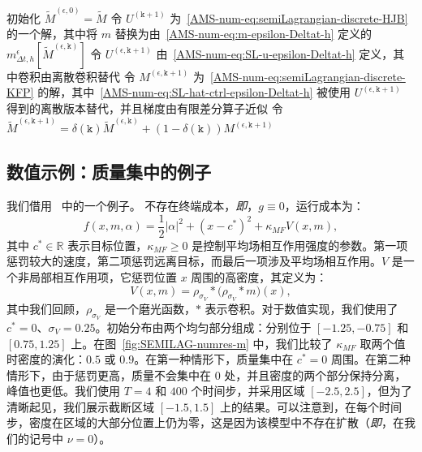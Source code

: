\documentclass{amsproc}
\theoremstyle{definition}
\theoremstyle{remark}
\numberwithin{equation}{section}
\newcommand{\RR}{{\mathbb R}}
\newcommand{\ctrl}{\alpha}
\begin{document}
\begin{algorithm}[H]
\DontPrintSemicolon

  初始化 $\tilde{M}^{(\epsilon, 0)} = \tilde M$ \;
        { 
        	令 $U^{(\mathtt{k}+1)}$ 为~\eqref{AMS-num-eq:semiLagrangian-discrete-HJB} 的一个解，其中将 $m$ 替换为由~\eqref{AMS-num-eq:m-epsilon-Deltat-h} 定义的 $m^{\epsilon}_{\Delta t, h}[\tilde{M}^{(\epsilon, \mathtt{k})}]$\;
	令 $U^{(\epsilon, \mathtt{k}+1)}$ 由~\eqref{AMS-num-eq:SL-u-epsilon-Deltat-h} 定义，其中卷积由离散卷积替代\;
	令 $M^{(\epsilon, \mathtt{k}+1)}$ 为~\eqref{AMS-num-eq:semiLagrangian-discrete-KFP} 的解，其中~\eqref{AMS-num-eq:SL-hat-ctrl-epsilon-Deltat-h} 被使用 $U^{(\epsilon, \mathtt{k}+1)}$ 得到的离散版本替代，并且梯度由有限差分算子近似 \;
	令 $\tilde{M}^{(\epsilon, \mathtt{k}+1)} = \delta(\mathtt{k}) \tilde{M}^{(\epsilon, \mathtt{k})} + (1-\delta(\mathtt{k})) M^{(\epsilon, \mathtt{k}+1)}$\;
	}
\caption{采用半拉格朗日格式的定点迭代 \label{AMS-num-algo:semi-Lagrangian-Picard}}
\end{algorithm}





\subsection{数值示例：质量集中的例子}

我们借用~\cite{MR3148086} 中的一个例子。 
不存在终端成本，\textit{即}，$g \equiv 0$，运行成本为：
$$
	f(x,m,\ctrl)
	= \frac{1}{2} |\ctrl|^2 + (x - c^*)^2 + \kappa_{MF} V(x,m),
$$
其中 $c^* \in \RR$ 表示目标位置，$\kappa_{MF} \ge 0$ 是控制平均场相互作用强度的参数。第一项惩罚较大的速度，第二项惩罚远离目标，而最后一项涉及平均场相互作用。$V$ 是一个非局部相互作用项，它惩罚位置 $x$ 周围的高密度，其定义为：
$$
	V(x,m) = \rho_{\sigma_V} * \big(\rho_{\sigma_V} * m\big)(x),
$$
其中我们回顾，$\rho_{\sigma_V}$ 是一个磨光函数，$*$ 表示卷积。对于数值实现，我们使用了 $c^*=0$、$\sigma_V = 0.25$。初始分布由两个均匀部分组成：分别位于 $[-1.25, -0.75]$ 和 $[0.75, 1.25]$ 上。在图~\ref{fig:SEMILAG-numres-m} 中，我们比较了 $\kappa_{MF}$ 取两个值时密度的演化：$0.5$ 或 $0.9$。在第一种情形下，质量集中在 $c^*=0$ 周围。在第二种情形下，由于惩罚更高，质量不会集中在 $0$ 处，并且密度的两个部分保持分离，峰值也更低。我们使用 $T = 4$ 和 $400$ 个时间步，并采用区域 $[-2.5,2.5]$，但为了清晰起见，我们展示截断区域 $[-1.5, 1.5]$ 上的结果。可以注意到，在每个时间步，密度在区域的大部分位置上仍为零，这是因为该模型中不存在扩散（\textit{即}，在我们的记号中 $\nu=0$）。
\end{document}
